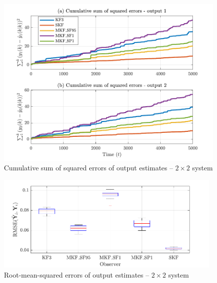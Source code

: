 \begin{figure}[htp]
	\centering
	\includegraphics[width=13cm]{images/rod_obs_sim2_cum_err.pdf}
	\caption{Cumulative sum of squared errors of output estimates –  $2\times2$ system}
	\label{fig:sim-sys-sim2-MKF-cumerr}
\end{figure}



\begin{figure}[htp]
	\centering
	\includegraphics[width=11cm]{images/rod_obs_sim2_all_seed_y_err_box.pdf}
	\caption{Root-mean-squared errors of output estimates – $2\times2$ system}
	\label{fig:rod-obs-sim2-yest-all-seed-RMSE-box}
\end{figure}

